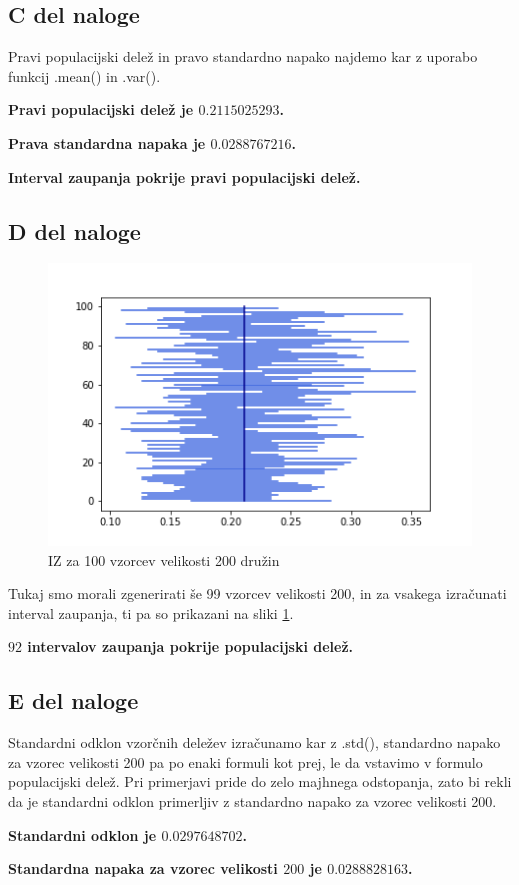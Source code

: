 \documentclass{article}
\begin{document}
    \subsection{C del naloge}
    Pravi populacijski delež in pravo standardno napako najdemo kar z uporabo funkcij .mean() in .var().
    \par \textbf{Pravi populacijski delež je $0.2115025293$.}
    \par \textbf{Prava standardna napaka je $0.0288767216$.}
    \par \textbf{Interval zaupanja pokrije pravi populacijski delež.}

    \subsection{D del naloge}
    \begin{figure}[H]
        \begin{center}
            \includegraphics[scale=0.5]{../PythonKoda/IZ200.png}
            \caption{IZ za 100 vzorcev velikosti 200 družin}
            \label{200}
        \end{center} 
    \end{figure}
    Tukaj smo morali zgenerirati še 99 vzorcev velikosti 200, in za vsakega izračunati interval zaupanja, ti pa so prikazani na sliki \ref{200}.
    \par \textbf{$92$ intervalov zaupanja pokrije populacijski delež.}

    \subsection{E del naloge}
    Standardni odklon vzorčnih deležev izračunamo kar z .std(), standardno napako za vzorec velikosti 200 pa po enaki formuli kot prej, le da vstavimo v formulo populacijski delež.
    Pri primerjavi pride do zelo majhnega odstopanja, zato bi rekli da je standardni odklon primerljiv z standardno napako za vzorec velikosti 200.
    \par \textbf{Standardni odklon je $0.0297648702$.}
    \par \textbf{Standardna napaka za vzorec velikosti $200$ je $0.0288828163$.}
\end{document}
